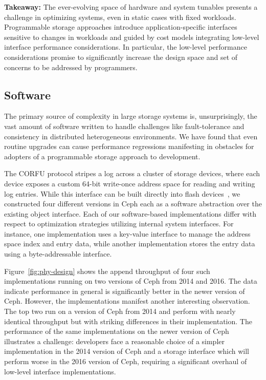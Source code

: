 \textbf{Takeaway:} The ever-evolving space of hardware and system tunables presents a challenge
in optimizing systems, even in static cases with fixed workloads. Programmable
storage approaches introduce application-specific interfaces sensitive to changes in workloads and 
guided by cost models integrating low-level interface performance considerations.
In particular, the low-level performance considerations promise to significantly increase the design space and set of
concerns to be addressed by programmers.

\subsection{Software}

The primary source of complexity in large storage systems is, unsurprisingly,
the vast amount of software written to handle challenges like fault-tolerance
and consistency in distributed heterogeneous environments. We have found that
even routine upgrades can cause performance regressions manifesting in obstacles 
for adopters of a programmable storage approach to development.

The CORFU protocol stripes a log across a cluster of storage
devices, where each device exposes a custom 64-bit write-once address space for reading
and writing log entries. While this interface can be built directly into flash
devices~\cite{wei:systor13}, we constructed four different versions in Ceph
each as a software abstraction over the existing object interface.
Each of our software-based implementations differ with respect to optimization
strategies utilizing internal system interfaces. For instance, one
implementation uses a key-value interface to manage the address space index
and entry data, while another implementation stores the entry data using a
byte-addressable interface. 

Figure~\ref{fig:phy-design} shows the append throughput of four such
implementations running on two versions of Ceph from 2014 and 2016. The data indicate 
performance in general is significantly better in the newer version of Ceph. 
However, the implementations manifest another interesting observation. The top two
run on a version of Ceph from 2014 and perform with nearly identical throughput 
but with striking differences in their implementation. The performance of the same
implementations on the newer version of Ceph illustrates a challenge: developers face a
reasonable choice of a simpler implementation in the 2014 version of Ceph and a storage interface
which will perform worse in the 2016 version of Ceph, requiring a significant overhaul of low-level
interface implementations.

